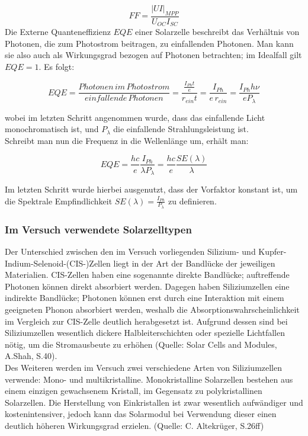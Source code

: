 \begin{equation*}
FF = \frac{|UI|_{MPP}}{U_{OC} I_{SC}}
\end{equation*}
Die Externe Quanteneffizienz $EQE$ einer Solarzelle beschreibt das Verhältnis von Photonen, die zum Photostrom beitragen, zu einfallenden Photonen. Man kann sie also auch als Wirkungsgrad bezogen auf Photonen betrachten; im Idealfall gilt $EQE = 1$. Es folgt:

\begin{equation}
EQE = \frac{Photonen \, im \, Photostrom}{einfallende \, Photonen} = \frac{ \frac{I_{Ph}t}{e}}{r_{ein}t} = \frac{I_{Ph}}{e \, r_{ein}} = \frac{I_{Ph} h \nu}{e P_\lambda}
\end{equation}

wobei im letzten Schritt angenommen wurde, dass das einfallende Licht monochromatisch ist, und $P_\lambda$ die einfallende Strahlungsleistung ist. \\
Schreibt man nun die Frequenz in die Wellenlänge um, erhält man:

\begin{equation}
EQE = \frac{h c}{e} \frac{I_{Ph}}{\lambda P_\lambda} = \frac{h c}{e} \frac{SE(\lambda)}{\lambda}
\end{equation}

Im letzten Schritt wurde hierbei ausgenutzt, dass der Vorfaktor konstant ist, um die Spektrale Empfindlichkeit $SE(\lambda) = \frac{I_{Ph}}{P_\lambda}$ zu definieren.

\subsubsection{Im Versuch verwendete Solarzelltypen}
Der Unterschied zwischen den im Versuch vorliegenden Silizium- und Kupfer-Indium-Selenoid-(CIS-)Zellen liegt in der Art der Bandlücke der jeweiligen Materialien. CIS-Zellen haben eine sogenannte direkte Bandlücke; auftreffende Photonen können direkt absorbiert werden. Dagegen haben Siliziumzellen eine indirekte Bandlücke; Photonen können erst durch eine Interaktion mit einem geeigneten Phonon absorbiert werden, weshalb die Absorptionswahrscheinlichkeit im Vergleich zur CIS-Zelle deutlich herabgesetzt ist. Aufgrund dessen sind bei Siliziumzellen wesentlich dickere Halbleiterschichten oder spezielle Lichtfallen nötig, um die Stromausbeute zu erhöhen (Quelle: Solar Cells and Modules, A.Shah, S.40). \\
Des Weiteren werden im Versuch zwei verschiedene Arten von Siliziumzellen verwende: Mono- und multikristalline. Monokristalline Solarzellen bestehen aus einem einzigen gewachsenem Kristall, im Gegensatz zu polykristallinen Solarzellen. Die Herstellung von Einkristallen ist zwar wesentlich aufwändiger und kostenintensiver, jedoch kann das Solarmodul bei Verwendung dieser einen deutlich höheren Wirkungsgrad erzielen. (Quelle: C. Altekrüger, S.26ff)
